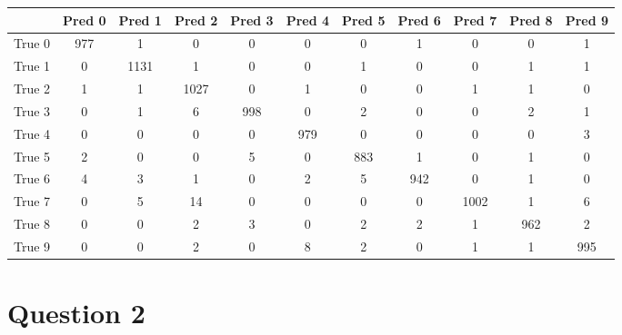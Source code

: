 \documentclass{article}
\begin{document}
\begin{tabular}{l c c c c c c c c c c}
        & Pred 0 & Pred 1 & Pred 2 & Pred 3 & Pred 4 & Pred 5 & Pred 6 & Pred 7 & Pred 8 & Pred 9 \\
\hline
True 0  &   977  &     1  &     0  &     0  &     0  &     0  &     1  &     0  &     0  &     1  \\
True 1  &     0  &  1131  &     1  &     0  &     0  &     1  &     0  &     0  &     1  &     1  \\
True 2  &     1  &     1  &  1027  &     0  &     1  &     0  &     0  &     1  &     1  &     0  \\
True 3  &     0  &     1  &     6  &   998  &     0  &     2  &     0  &     0  &     2  &     1  \\
True 4  &     0  &     0  &     0  &     0  &   979  &     0  &     0  &     0  &     0  &     3  \\
True 5  &     2  &     0  &     0  &     5  &     0  &   883  &     1  &     0  &     1  &     0  \\
True 6  &     4  &     3  &     1  &     0  &     2  &     5  &   942  &     0  &     1  &     0  \\
True 7  &     0  &     5  &    14  &     0  &     0  &     0  &     0  &  1002  &     1  &     6  \\
True 8  &     0  &     0  &     2  &     3  &     0  &     2  &     2  &     1  &   962  &     2  \\
True 9  &     0  &     0  &     2  &     0  &     8  &     2  &     0  &     1  &     1  &   995  \\
\end{tabular}




\section{Question 2}
\end{document}
